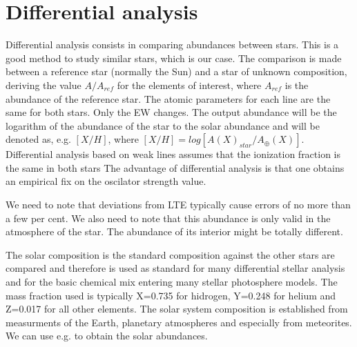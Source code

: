 \documentclass[dvips,12pt,a4paper]{report}
\begin{document}
{\section {Differential analysis}
\label {difanal}



Differential analysis consists in comparing abundances between stars. This is a good method to study similar stars, which is our case.  The comparison is made between a reference star (normally the Sun) and a star of unknown composition, deriving the value $A/A_{ref}$ for the elements of interest, where $A_{ref}$ is the abundance of the reference star. The atomic parameters for each line are the same for both stars. Only the EW changes. The output abundance will be the logarithm of the abundance of the star to the solar abundance and will be denoted as, e.g. $[X/H]$, where $[X/H]=log[A(X)_{star}/A_\oplus(X)]$. Differential analysis based on weak lines assumes that the ionization fraction is the same in both stars %
The advantage of differential analysis is that one obtains an empirical fix on the oscilator strength value. 

We need to note that deviations from LTE typically cause errors of no more than a few per cent. We also need to note that this abundance is only valid in the atmosphere of the star. The abundance of its interior might be totally different.

The solar composition is the standard composition against the other stars are compared and therefore is used as standard for many differential stellar analysis and for the basic chemical mix entering many stellar photosphere models. The mass fraction used is typically X=0.735 for hidrogen, Y=0.248 for helium and Z=0.017 for all other elements. The solar system composition is established from measurments of the Earth, planetary atmospheres and especially from meteorites. We can use e.g. \citet{Anders-1989} to obtain the solar abundances. 


}
\end{document}
